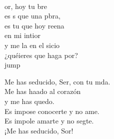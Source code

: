 \begin{cancion}
\begin{chorus}
	\end{chorus}%
	\jump\\
	or, hoy tu bre  \\
	es s que una pbra, \\
	es tu  que hoy reena \\
	en mi intior \\
	y me la en el sicio\\
	¿quéieres que haga por? \\jump\\
	\begin{chorus}%
	Me has seducido, Ser, con tu mda.\\
	Me has haado al corazón \\
	y me has quedo.\\
	Es impose conocerte y no ame.\\
	Es impole amarte y no segte.\\
	¡Me has seducido, Sor!\\
	\end{chorus}%
	\jump\\
\end{cancion}%
